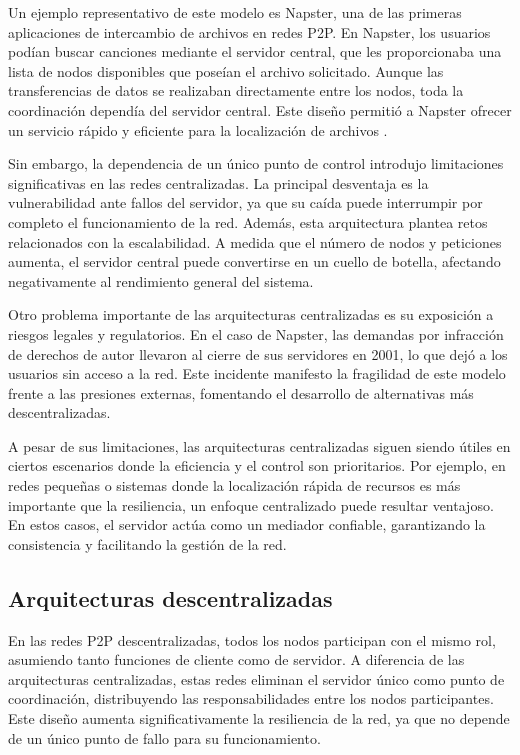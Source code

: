 Un ejemplo representativo de este modelo es Napster, una de las primeras aplicaciones de intercambio de archivos en redes P2P.
En Napster, los usuarios podían buscar canciones mediante el servidor central, que les proporcionaba una lista de nodos disponibles que poseían el archivo solicitado.
Aunque las transferencias de datos se realizaban directamente entre los nodos, toda la coordinación dependía del servidor central.
Este diseño permitió a Napster ofrecer un servicio rápido y eficiente para la localización de archivos \cite{oram2001}.

Sin embargo, la dependencia de un único punto de control introdujo limitaciones significativas en las redes centralizadas.
La principal desventaja es la vulnerabilidad ante fallos del servidor, ya que su caída puede interrumpir por completo el funcionamiento de la red.
Además, esta arquitectura plantea retos relacionados con la escalabilidad.
A medida que el número de nodos y peticiones aumenta, el servidor central puede convertirse en un cuello de botella, afectando negativamente al rendimiento general del sistema.

Otro problema importante de las arquitecturas centralizadas es su exposición a riesgos legales y regulatorios.
En el caso de Napster, las demandas por infracción de derechos de autor llevaron al cierre de sus servidores en 2001, lo que dejó a los usuarios sin acceso a la red.
Este incidente manifesto la fragilidad de este modelo frente a las presiones externas, fomentando el desarrollo de alternativas más descentralizadas.

A pesar de sus limitaciones, las arquitecturas centralizadas siguen siendo útiles en ciertos escenarios donde la eficiencia y el control son prioritarios.
Por ejemplo, en redes pequeñas o sistemas donde la localización rápida de recursos es más importante que la resiliencia, un enfoque centralizado puede resultar ventajoso.
En estos casos, el servidor actúa como un mediador confiable, garantizando la consistencia y facilitando la gestión de la red.

\subsection{Arquitecturas descentralizadas}

En las redes P2P descentralizadas, todos los nodos participan con el mismo rol, asumiendo tanto funciones de cliente como de servidor.
A diferencia de las arquitecturas centralizadas, estas redes eliminan el servidor único como punto de coordinación, distribuyendo las responsabilidades entre los nodos participantes.
Este diseño aumenta significativamente la resiliencia de la red, ya que no depende de un único punto de fallo para su funcionamiento.

